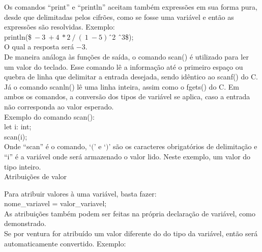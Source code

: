 \documentclass[12pt,a4paper]{article}
\begin{document}
Os comandos ``print'' e ``println'' aceitam também expressões em sua forma pura, desde que delimitadas pelos cifrões, como se fosse uma variável e então as expressões são resolvidas. Exemplo: \\

println(\$$\ -3\ +4\ *2\ /\ (\ 1\ - 5)$\^\ 2 \^\ 3\$);\\

O qual a resposta será $-3$.\\

De maneira análoga às funções de saída, o comando scan() é utilizado para ler um valor do teclado. Esse comando lê a informação até o primeiro espaço ou quebra de linha que delimitar a entrada desejada, sendo idêntico ao scanf() do C. Já o comando scanln() lê uma linha inteira, assim como o fgets() do C. Em ambos os comandos, a conversão dos tipos de variável se aplica, caso a entrada não corresponda ao valor esperado.\\

Exemplo do comando scan(): \\

let i: int;\\

scan(i);\\

Onde ``scan'' é o comando, `$($' e `$)$' são os caracteres obrigatórios de delimitação e ``i'' é a variável onde será armazenado o valor lido. Neste exemplo, um valor do tipo inteiro.\\


\hypertarget{label2}{\Large{Atribuições de valor}}\\[0.3cm]
\normalsize

Para atribuir valores à uma variável, basta fazer: \\

nome\_variavel = valor\_variavel; \\

As atribuições também podem ser feitas na própria declaração de variável, como demonstrado. \\

Se por ventura for atribuído um valor diferente do do tipo da variável, então será automaticamente convertido. Exemplo:\\
\end{document}
